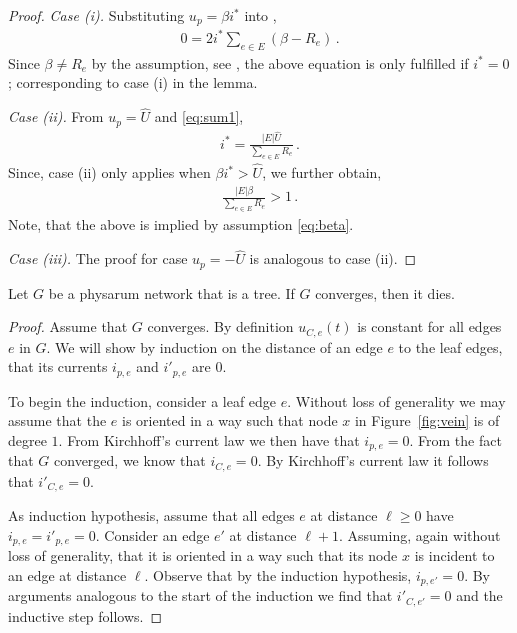 \begin{proof}
\medskip

\noindent
{\em Case (i).} Substituting $u_p = \beta i^*$ into ,
\begin{align}
0 = 2 i^*\sum_{e \in E} (\beta - R_e)\,.
\end{align}
Since $\beta \neq R_e$ by the assumption, see , the above equation is
  only fulfilled if $i^* = 0$; corresponding to case (i) in the lemma.

\medskip
  
\noindent
{\em Case (ii).} From $u_p = \hat{U}$ and \eqref{eq:sum1},
\begin{align}
i^* = \frac{|E|\hat{U}}{\sum_{e \in E} R_e}\,.
\end{align}
Since, case (ii) only applies when $\beta i^* > \hat{U}$, we further obtain,
\begin{align}
\frac{|E|\beta}{\sum_{e \in E} R_e} > 1\,.
\end{align}
Note, that the above is implied by assumption \eqref{eq:beta}.

\medskip

\noindent
{\em Case (iii).} The proof for case $u_p = -\hat{U}$ is analogous
  to case (ii). 

\end{proof}


\begin{lem}\label{lem:tree_cont}
Let $G$ be a physarum network that is a tree.
If $G$ converges, then it dies.
\end{lem}
\begin{proof}
Assume that $G$ converges.
By definition $u_{C,e}(t)$ is constant for all edges $e$ in $G$. 
We will show by induction on the distance of an edge $e$ to the leaf edges,
  that its currents $i_{p,e}$ and $i'_{p,e}$ are $0$.

To begin the induction, consider a leaf edge $e$.
Without loss of generality we may assume that the $e$ is oriented in a way such that node $x$ in Figure~\ref{fig:vein} is of degree $1$. From Kirchhoff's current law we then have that $i_{p,e} = 0$. From the fact that $G$ converged, we know that $i_{C,e} = 0$. By Kirchhoff's current law it follows that $i'_{C,e} = 0$.

As induction hypothesis, assume that all edges $e$ at distance $\ell \ge 0$ have $i_{p,e} = i'_{p,e} = 0$.
Consider an edge $e'$ at distance $\ell+1$. Assuming, again without loss of generality, that it is oriented in a way such that its node $x$ is incident to an edge at distance $\ell$. Observe that by the induction hypothesis, $i_{p,e'} = 0$. By arguments analogous to the start of the induction we find that $i'_{C,e'} = 0$ and the inductive step follows.  
\end{proof}
  
